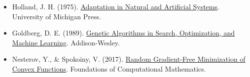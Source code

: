 \vspace{0.25em}
\begin{itemize}
\tightlist
\item
  Holland, J. H. (1975). \href{https://openlibrary.org/books/OL5070129M/Adaptation_in_natural_and_artificial_systems}{Adaptation in Natural and Artificial Systems}. University of Michigan Press.
\item
  Goldberg, D. E. (1989). \href{https://openlibrary.org/books/OL2030750M/Genetic_algorithms_in_search_optimization_and_machine_learning}{Genetic Algorithms in Search, Optimization, and Machine Learning}. Addison-Wesley.
\item
  Nesterov, Y., \& Spokoiny, V. (2017). \href{https://doi.org/10.1007/s10208-015-9296-2}{Random Gradient-Free Minimization of Convex Functions}. Foundations of Computational Mathematics.
\end{itemize}

\clearpage
